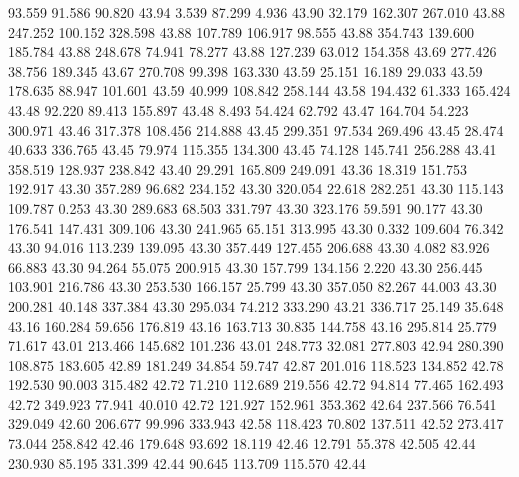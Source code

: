   93.559   91.586   90.820        43.94
   3.539   87.299    4.936        43.90
  32.179  162.307  267.010        43.88
 247.252  100.152  328.598        43.88
 107.789  106.917   98.555        43.88
 354.743  139.600  185.784        43.88
 248.678   74.941   78.277        43.88
 127.239   63.012  154.358        43.69
 277.426   38.756  189.345        43.67
 270.708   99.398  163.330        43.59
  25.151   16.189   29.033        43.59
 178.635   88.947  101.601        43.59
  40.999  108.842  258.144        43.58
 194.432   61.333  165.424        43.48
  92.220   89.413  155.897        43.48
   8.493   54.424   62.792        43.47
 164.704   54.223  300.971        43.46
 317.378  108.456  214.888        43.45
 299.351   97.534  269.496        43.45
  28.474   40.633  336.765        43.45
  79.974  115.355  134.300        43.45
  74.128  145.741  256.288        43.41
 358.519  128.937  238.842        43.40
  29.291  165.809  249.091        43.36
  18.319  151.753  192.917        43.30
 357.289   96.682  234.152        43.30
 320.054   22.618  282.251        43.30
 115.143  109.787    0.253        43.30
 289.683   68.503  331.797        43.30
 323.176   59.591   90.177        43.30
 176.541  147.431  309.106        43.30
 241.965   65.151  313.995        43.30
   0.332  109.604   76.342        43.30
  94.016  113.239  139.095        43.30
 357.449  127.455  206.688        43.30
   4.082   83.926   66.883        43.30
  94.264   55.075  200.915        43.30
 157.799  134.156    2.220        43.30
 256.445  103.901  216.786        43.30
 253.530  166.157   25.799        43.30
 357.050   82.267   44.003        43.30
 200.281   40.148  337.384        43.30
 295.034   74.212  333.290        43.21
 336.717   25.149   35.648        43.16
 160.284   59.656  176.819        43.16
 163.713   30.835  144.758        43.16
 295.814   25.779   71.617        43.01
 213.466  145.682  101.236        43.01
 248.773   32.081  277.803        42.94
 280.390  108.875  183.605        42.89
 181.249   34.854   59.747        42.87
 201.016  118.523  134.852        42.78
 192.530   90.003  315.482        42.72
  71.210  112.689  219.556        42.72
  94.814   77.465  162.493        42.72
 349.923   77.941   40.010        42.72
 121.927  152.961  353.362        42.64
 237.566   76.541  329.049        42.60
 206.677   99.996  333.943        42.58
 118.423   70.802  137.511        42.52
 273.417   73.044  258.842        42.46
 179.648   93.692   18.119        42.46
  12.791   55.378   42.505        42.44
 230.930   85.195  331.399        42.44
  90.645  113.709  115.570        42.44
